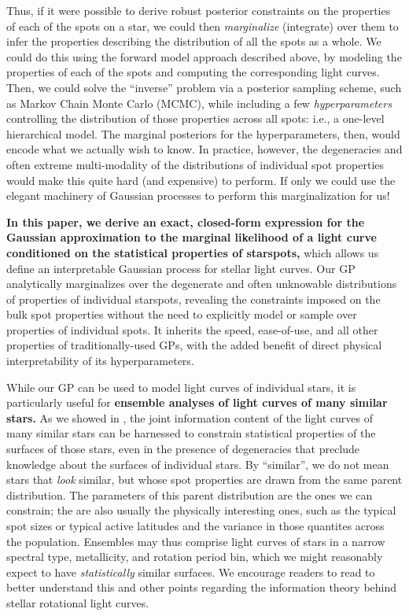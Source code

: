 \documentclass[modern,linenumbers]{aastex62}
\begin{document}
Thus, if it were possible to derive robust posterior constraints
on the properties of each of the spots on a star, we could then
\emph{marginalize} (integrate) over them to infer the properties
describing the distribution of all the spots as a whole.
We could do this using the forward model approach described above, by
modeling the properties of each of the spots and computing the
corresponding light curves. Then, we could solve the ``inverse'' problem
via a posterior sampling scheme, such as Markov Chain Monte Carlo (MCMC),
while including a few
\emph{hyperparameters} controlling the distribution of those properties
across all spots: i.e., a one-level hierarchical model.
The marginal posteriors for the hyperparameters, then,
would encode what we actually wish to know.
%
In practice, however, the degeneracies and often extreme multi-modality
of the distributions of individual spot properties would make this
quite hard (and expensive) to perform.
%
If only we could use the elegant machinery of Gaussian processes to
perform this marginalization for us!

\textbf{In this paper, we derive an exact, closed-form expression for
    the Gaussian approximation to the marginal likelihood of a light curve
    conditioned on the statistical properties of starspots,} which allows us
define an interpretable Gaussian process for stellar light curves.
%
Our GP analytically marginalizes over the degenerate and often unknowable
distributions of properties of individual starspots, revealing the
constraints imposed on the bulk spot properties without the need to
explicitly model or sample over properties of individual spots. It inherits
the speed, ease-of-use, and all other properties of traditionally-used
GPs, with the added benefit of direct physical interpretability of its
hyperparameters.
%

While our GP can be used to model light curves of individual
stars, it is particularly useful for \textbf{ensemble analyses of light curves of
    many similar stars.}
As we showed in , the joint information content of
the light curves of many similar stars can be harnessed to constrain
statistical properties of the surfaces of those stars, even in the
presence of degeneracies that preclude knowledge about the surfaces
of individual stars.
By ``similar'', we do not mean stars that \emph{look} similar, but
whose spot properties are drawn from
the same parent distribution. The parameters of this parent distribution
are the ones we can constrain; the are also usually the physically
interesting ones, such as the typical spot sizes or typical active
latitudes and the variance in those quantites across the
population.
Ensembles may thus comprise light curves of stars in
a narrow spectral type, metallicity, and rotation period bin,
which we might reasonably expect to have \emph{statistically}
similar surfaces.
%
We encourage readers to read  to
better understand this and other points regarding the information theory
behind stellar rotational light curves.
\end{document}
